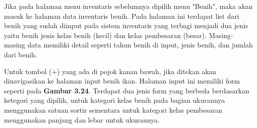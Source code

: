 \begin{spacing}{1.5}
	Jika pada halaman menu inventaris sebelumnya dipilih menu "Benih", maka akan masuk ke halaman data inventaris benih. Pada halaman ini terdapat list dari benih yang sudah diinput pada sistem inventaris yang terbagi menjadi dua jenis yaitu benih jenis kelas benih (kecil) dan kelas pembesaran (besar). Masing-masing data memiliki detail seperti tahun benih di input, jenis benih, dan jumlah dari benih.

	Untuk tombol (+) yang ada di pojok kanan bawah, jika ditekan akan dinavigasikan ke halaman input benih ikan. Halaman input ini memiliki form seperti pada \textbf{Gambar 3.24}. Terdapat dua jenis form yang berbeda berdasarkan ketegori yang dipilih, untuk kategori kelas benih pada bagian ukurannya menggunakan satuan sortir sementara untuk kategori kelas pembesaran menggunakan panjang dan lebar untuk ukurannya.


\end{spacing}
